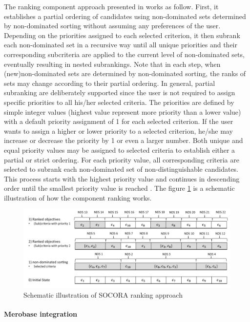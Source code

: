 The ranking component approach presented in \cite{Kessel2016} works as follow. First, it establishes a partial ordering of candidates using non-dominated sets determined by non-dominated sorting without assuming any preferences of the user. Depending on the priorities assigned to each selected criterion, it then subrank each non-dominated set in a recursive way until all unique priorities and their corresponding subcriteria are applied to the current level of non-dominated sets, eventually resulting in nested subrankings. Note that in each step, when (new)non-dominated sets are determined by non-dominated sorting, the ranks of sets may change according to their partial ordering. In general, partial subranking are deliberately supported since the user is not required to assign specific priorities to all his/her selected criteria. The priorities are defined by simple integer values (highest value represent more priority than a lower value) with a default priority assignment of 1 for each selected criterion. If the user wants to assign a higher or lower priority to a selected criterion, he/she may increase or decrease the priority by 1 or even a larger number. Both unique and equal priority values may be assigned to selected criteria to establish either a partial or strict ordering. For each priority value, all corresponding criteria are selected to subrank each non-dominated set of non-distinguishable candidates. This process starts with the highest priority value and continues in descending order until the smallest priority value is reached \cite{Kessel2016}. The figure \ref{fig:socora-ex} is a schematic illustration of how the component ranking works.

\begin{figure}[ht]
	\centering
    \includegraphics[width=\textwidth]{grafiken/socoraExample}
    \caption{Schematic illustration of SOCORA ranking approach \cite{Kessel2016}}
    \label{fig:socora-ex}
\end{figure}

\paragraph{Merobase integration}

